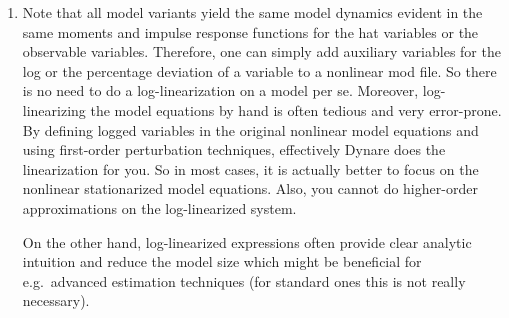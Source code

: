 \begin{enumerate}
\item Note that all model variants yield the same model dynamics
  evident in the same moments and impulse response functions for the hat variables or the observable variables.
Therefore, one can simply add auxiliary variables for the log or the percentage deviation of a variable to a nonlinear mod file.
So there is no need to do a log-linearization on a model per se.
Moreover, log-linearizing the model equations by hand is often tedious and very error-prone.
By defining logged variables in the original nonlinear model equations and using first-order perturbation techniques,
  effectively Dynare does the linearization for you.
So in most cases, it is actually better to focus on the nonlinear stationarized model equations.
Also, you cannot do higher-order approximations on the log-linearized system.

On the other hand, log-linearized expressions often provide clear analytic intuition
  and reduce the model size which might be beneficial for e.g.\ advanced estimation techniques
  (for standard ones this is not really necessary).
\end{enumerate}